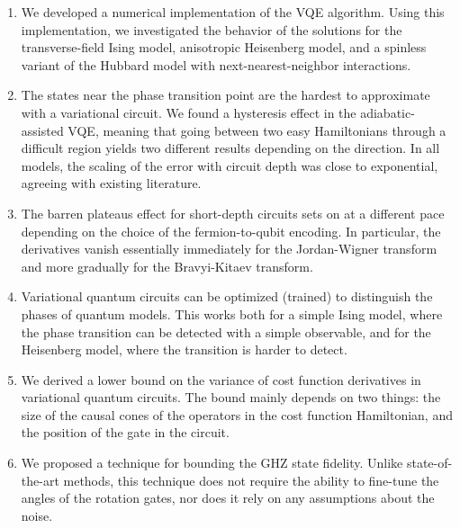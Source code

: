 \begin{enumerate}
    \item We developed a numerical implementation of the VQE algorithm. Using this implementation, we investigated the behavior of the solutions for the transverse-field Ising model, anisotropic Heisenberg model, and a spinless variant of the Hubbard model with next-nearest-neighbor interactions. 
    \item The states near the phase transition point are the hardest to approximate with a variational circuit. We found a hysteresis effect in the adiabatic-assisted VQE, meaning that going between two easy Hamiltonians through a difficult region yields two different results depending on the direction. In all models, the scaling of the error with circuit depth was close to exponential, agreeing with existing literature.
    \item The barren plateaus effect for short-depth circuits sets on at a different pace depending on the choice of the fermion-to-qubit encoding. In particular, the derivatives vanish essentially immediately for the Jordan-Wigner transform and more gradually for the Bravyi-Kitaev transform.
    \item Variational quantum circuits can be optimized (trained) to distinguish the phases of quantum models. This works both for a simple Ising model, where the phase transition can be detected with a simple observable, and for the Heisenberg model, where the transition is harder to detect.
    \item We derived a lower bound on the variance of cost function derivatives in variational quantum circuits. The bound mainly depends on two things: the size of the causal cones of the operators in the cost function Hamiltonian, and the position of the gate in the circuit.
    \item We proposed a technique for bounding the GHZ state fidelity. Unlike state-of-the-art methods, this technique does not require the ability to fine-tune the angles of the rotation gates, nor does it rely on any assumptions about the noise.
\end{enumerate}